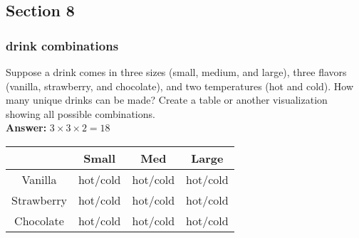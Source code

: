 \documentclass{article}
\begin{document}
\subsection{Section 8}

\subsubsection{drink combinations}

Suppose a drink comes in three sizes (small, medium, and large), three flavors (vanilla, strawberry, and chocolate), and two temperatures (hot and cold). How many unique drinks can be made? Create a table or another visualization showing all possible combinations.\\

\textbf{Answer:} $3 \times 3 \times 2 = 18$
\begin{table}[h]
\begin{tabular}{@{}cccc@{}}
\toprule
 & Small & Med & Large  \\ \midrule
Vanilla & hot/cold & hot/cold & hot/cold   \\
Strawberry & hot/cold & hot/cold &  hot/cold \\
Chocolate & hot/cold & hot/cold  & hot/cold \\ \bottomrule
\end{tabular}
\end{table}
\end{document}
